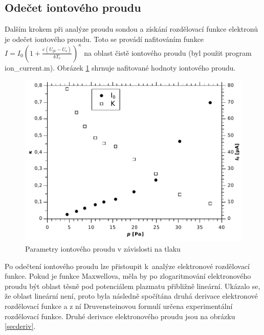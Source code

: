 \documentclass[12pt]{article}
\begin{document}
\subsection{Odečet iontového proudu}
Dalším krokem při analýze proudu sondou a získání rozdělovací funkce elektronů je odečet iontového proudu. Toto se provádí nafitováním funkce $I = I_0 \left(1 + \frac{e(U_\mathrm{pl} - U_\mathrm{s})}{k T_\mathrm{e}}\right)^\kappa$ na oblast čistě iontového proudu (byl použit program ion\_current.m).  Obrázek \ref{ionparameters} shrnuje nafitované hodnoty iontového proudu.

\begin{figure}[htbp]
\begin{center}
\includegraphics[width=12.8cm]{img/ionts.pdf}
\caption{Parametry iontového proudu v závislosti na tlaku}
\label{ionparameters}
\end{center}
\end{figure}

Po odečtení iontového proudu lze přistoupit k~analýze elektronové rozdělovací funkce. Pokud je funkce Maxwellova, měla by po zlogaritmování elektronového proudu být oblast těsně pod potenciálem plazmatu přibližně lineární. Ukázalo se, že oblast lineární není, proto byla následně spočítána druhá derivace elektronové rozdělovací funkce a z ní Druvensteinovou formulí určena experimentální rozdělovací funkce. Druhé derivace elektronového proudu jsou na obrázku \ref{secderiv}.
\end{document}
